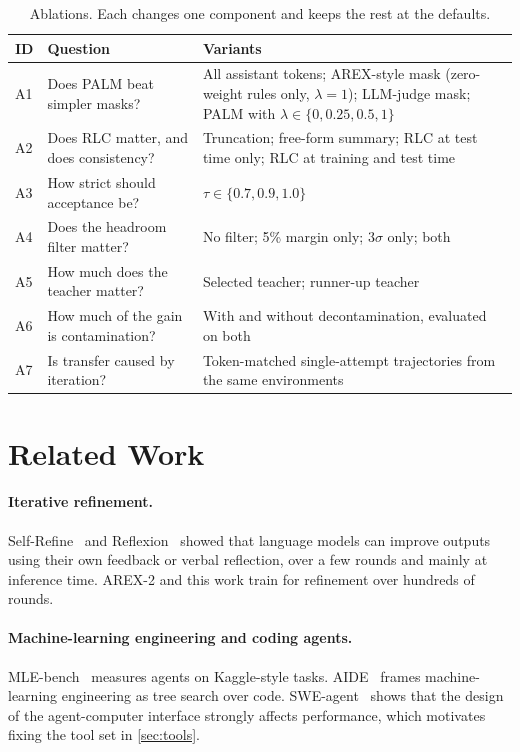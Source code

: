\documentclass[11pt]{article}
\begin{document}
\begin{table}[t]
\centering
\small
\caption{Ablations. Each changes one component and keeps the rest at the defaults.}
\label{tab:ablations}
\begin{tabularx}{\linewidth}{@{}l l Y@{}}
\toprule
ID & Question & Variants \\
\midrule
A1 & Does PALM beat simpler masks? & All assistant tokens; AREX-style mask (zero-weight rules only, $\lambda=1$); LLM-judge mask; PALM with $\lambda \in \{0, 0.25, 0.5, 1\}$ \\
A2 & Does RLC matter, and does consistency? & Truncation; free-form summary; RLC at test time only; RLC at training and test time \\
A3 & How strict should acceptance be? & $\tau \in \{0.7, 0.9, 1.0\}$ \\
A4 & Does the headroom filter matter? & No filter; 5\% margin only; $3\sigma$ only; both \\
A5 & How much does the teacher matter? & Selected teacher; runner-up teacher \\
A6 & How much of the gain is contamination? & With and without decontamination, evaluated on both \\
A7 & Is transfer caused by iteration? & Token-matched single-attempt trajectories from the same environments \\
\bottomrule
\end{tabularx}
\end{table}

\section{Related Work}
\label{sec:related}

\paragraph{Iterative refinement.}
Self-Refine~\citep{madaan2023selfrefine} and Reflexion~\citep{shinn2023reflexion} showed that language models can improve outputs using their own feedback or verbal reflection, over a few rounds and mainly at inference time. AREX-2 and this work train for refinement over hundreds of rounds.

\paragraph{Machine-learning engineering and coding agents.}
MLE-bench~\citep{chan2025mlebench} measures agents on Kaggle-style tasks. AIDE~\citep{jiang2025aide} frames machine-learning engineering as tree search over code. SWE-agent~\citep{yang2024sweagent} shows that the design of the agent-computer interface strongly affects performance, which motivates fixing the tool set in \cref{sec:tools}.
\end{document}

